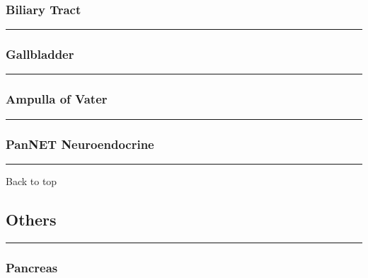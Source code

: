 \documentclass[]{article}
\begin{document}
\hypertarget{biliary-tract-2}{%
\subsubsection{Biliary Tract}\label{biliary-tract-2}}

\begin{center}\rule{0.5\linewidth}{\linethickness}\end{center}

\hypertarget{gallbladder-2}{%
\subsubsection{Gallbladder}\label{gallbladder-2}}

\begin{center}\rule{0.5\linewidth}{\linethickness}\end{center}

\hypertarget{ampulla-of-vater-2}{%
\subsubsection{Ampulla of Vater}\label{ampulla-of-vater-2}}

\begin{center}\rule{0.5\linewidth}{\linethickness}\end{center}

\hypertarget{pannet-neuroendocrine-2}{%
\subsubsection{PanNET Neuroendocrine}\label{pannet-neuroendocrine-2}}

\begin{center}\rule{0.5\linewidth}{\linethickness}\end{center}

Back to top

\pagebreak

\hypertarget{others}{%
\subsection{Others}\label{others}}

\begin{center}\rule{0.5\linewidth}{\linethickness}\end{center}

\hypertarget{pancreas-3}{%
\subsubsection{Pancreas}\label{pancreas-3}}
\end{document}
